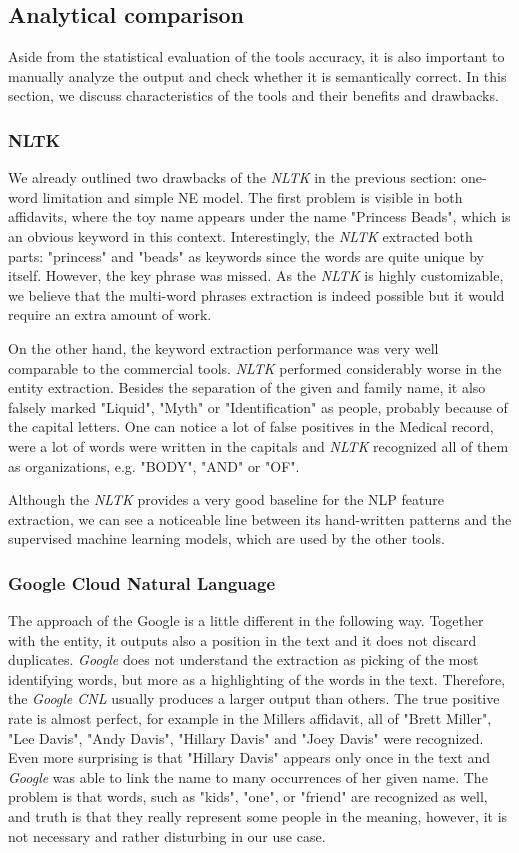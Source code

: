 \documentclass[
  digital, %
  notable,   %
  nolof,     %
  nolot,     %
]{fithesis3}
\begin{document}
\subsection{Analytical comparison}
Aside from the statistical evaluation of the tools accuracy, it is also important to manually analyze the output and check whether it is semantically correct.
In this section, we discuss characteristics of the tools and their benefits and drawbacks.

\subsubsection{\textbf{NLTK}}
We already outlined two drawbacks of the \textit{NLTK} in the previous section: one-word limitation and simple NE model.
The first problem is visible in both affidavits, where the toy name appears under the name "Princess Beads", which is an obvious keyword in this context.
Interestingly, the \textit{NLTK} extracted both parts: "princess" and "beads" as keywords since the words are quite unique by itself.
However, the key phrase was missed.
As the \textit{NLTK} is highly customizable, we believe that the multi-word phrases extraction is indeed possible but it would require an extra amount of work.

On the other hand, the keyword extraction performance was very well comparable to the commercial tools.
\textit{NLTK} performed considerably worse in the entity extraction.
Besides the separation of the given and family name, it also falsely marked "Liquid", "Myth" or "Identification" as people, probably because of the capital letters.
One can notice a lot of false positives in the Medical record, were a lot of words were written in the capitals and \textit{NLTK} recognized all of them as organizations, e.g. "BODY", "AND" or "OF".

Although the \textit{NLTK} provides a very good baseline for the NLP feature extraction, we can see a noticeable line between its hand-written patterns and the supervised machine learning models, which are used by the other tools.

\subsubsection{\textbf{Google Cloud Natural Language}}
The approach of the Google is a little different in the following way.
Together with the entity, it outputs also a position in the text and it does not discard duplicates.
\textit{Google} does not understand the extraction as picking of the most identifying words, but more as a highlighting of the words in the text.
Therefore, the \textit{Google CNL} usually produces a larger output than others.
The true positive rate is almost perfect, for example in the Millers affidavit, all of "Brett Miller", "Lee Davis", "Andy Davis", "Hillary Davis" and "Joey Davis" were recognized.
Even more surprising is that "Hillary Davis" appears only once in the text and \textit{Google} was able to link the name to many occurrences of her given name.
The problem is that words, such as "kids", "one", or "friend" are recognized as well, and truth is that they really represent some people in the meaning, however, it is not necessary and rather disturbing in our use case.
\end{document}
